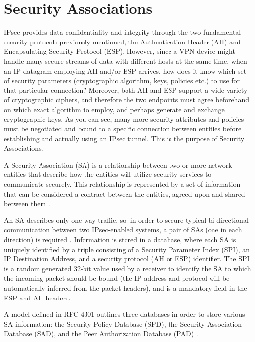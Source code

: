 \documentclass[a4paper,12pt]{report}
\begin{document}
	\section{Security Associations}
	IPsec provides data confidentiality and integrity through the two fundamental security protocols previously mentioned, the Authentication Header (AH) and Encapsulating Security Protocol (ESP). However, since a VPN device might handle many secure streams of data with different hosts at the same time, when an IP datagram employing AH and/or ESP arrives, how does it know which set of security parameters (cryptographic algorithm, keys, policies etc.) to use for that particular connection? Moreover, both AH and ESP support a wide variety of cryptographic ciphers, and therefore the two endpoints must agree beforehand on which exact algorithm to employ, and perhaps generate and exchange cryptographic keys. As you can see, many more security attributes and policies must be negotiated and bound to a specific connection between entities before establishing and actually using an IPsec tunnel. This is the purpose of Security Associations. 
	
	A Security Association (SA) is a relationship between two or more network entities that describe how the entities will utilize security services to communicate securely. This relationship is represented by a set of information that can be considered a contract between the entities, agreed upon and shared between them \cite{rfc2408}. 
	
	An SA describes only one-way traffic, so, in order to secure typical bi-directional communication between two IPsec-enabled systems, a pair of SAs (one in each direction) is required \cite{rfc4301}. Information is stored in a database, where each SA is uniquely identified by a triple consisting of a Security Parameter Index (SPI), an IP Destination Address, and a security protocol (AH or ESP) identifier. The SPI is a random generated 32-bit value used by a receiver to identify the SA to which the incoming packet should be bound (the IP address and protocol will be automatically inferred from the packet headers), and is a mandatory field in the ESP and AH headers.
	
	A model defined in RFC 4301 outlines three databases in order to store various SA information: the Security Policy Database (SPD), the Security Association Database (SAD), and the Peer Authorization Database (PAD) \cite{rfc4301}.
	
\end{document}
